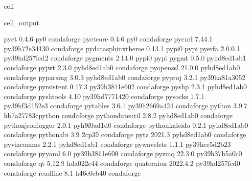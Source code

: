 \documentclass[letterpaper,table,10pt,english]{jupyterBook}
\begin{document}
\begin{sphinxuseclass}{cell}
\begin{sphinxVerbatimOutput}
\begin{sphinxuseclass}{cell_output}
\begin{sphinxVerbatim}[commandchars=\\\{\}]
pyct                      0.4.6                      py\PYGZus{}0    conda\PYGZhy{}forge
pyct\PYGZhy{}core                 0.4.6                      py\PYGZus{}0    conda\PYGZhy{}forge
pycurl                    7.44.1           py39h72e3413\PYGZus{}0    conda\PYGZhy{}forge
pydata\PYGZhy{}sphinx\PYGZhy{}theme       0.13.1                   pypi\PYGZus{}0    pypi
pyerfa                    2.0.0.1          py39hd257fcd\PYGZus{}2    conda\PYGZhy{}forge
pygments                  2.14.0                   pypi\PYGZus{}0    pypi
pygmt                     0.5.0              pyhd8ed1ab\PYGZus{}1    conda\PYGZhy{}forge
pyjwt                     2.3.0              pyhd8ed1ab\PYGZus{}0    conda\PYGZhy{}forge
pyopenssl                 21.0.0             pyhd8ed1ab\PYGZus{}0    conda\PYGZhy{}forge
pyparsing                 3.0.3              pyhd8ed1ab\PYGZus{}0    conda\PYGZhy{}forge
pyproj                    3.2.1            py39ha81a305\PYGZus{}2    conda\PYGZhy{}forge
pyrsistent                0.17.3           py39h3811e60\PYGZus{}2    conda\PYGZhy{}forge
pyshp                     2.3.1              pyhd8ed1ab\PYGZus{}0    conda\PYGZhy{}forge
pyshtools                 4.10             py39hd777142\PYGZus{}0    conda\PYGZhy{}forge
pysocks                   1.7.1            py39hf3d152e\PYGZus{}3    conda\PYGZhy{}forge
pytables                  3.6.1            py39h2669a42\PYGZus{}4    conda\PYGZhy{}forge
python                    3.9.7           hb7a2778\PYGZus{}3\PYGZus{}cpython    conda\PYGZhy{}forge
python\PYGZhy{}dateutil           2.8.2              pyhd8ed1ab\PYGZus{}0    conda\PYGZhy{}forge
python\PYGZhy{}json\PYGZhy{}logger        2.0.1              pyh9f0ad1d\PYGZus{}0    conda\PYGZhy{}forge
python\PYGZhy{}kaleido            0.2.1              pyhd8ed1ab\PYGZus{}0    conda\PYGZhy{}forge
python\PYGZus{}abi                3.9                      2\PYGZus{}cp39    conda\PYGZhy{}forge
pytz                      2021.3             pyhd8ed1ab\PYGZus{}0    conda\PYGZhy{}forge
pyviz\PYGZus{}comms               2.2.1              pyhd8ed1ab\PYGZus{}1    conda\PYGZhy{}forge
pywavelets                1.1.1            py39hce5d2b2\PYGZus{}3    conda\PYGZhy{}forge
pyyaml                    6.0              py39h3811e60\PYGZus{}0    conda\PYGZhy{}forge
pyzmq                     22.3.0           py39h37b5a0c\PYGZus{}0    conda\PYGZhy{}forge
qt                        5.12.9               hda022c4\PYGZus{}4    conda\PYGZhy{}forge
quaternion                2022.4.2         py39hd257fcd\PYGZus{}0    conda\PYGZhy{}forge
readline                  8.1                  h46c0cb4\PYGZus{}0    conda\PYGZhy{}forge

\end{sphinxVerbatim}
\end{sphinxuseclass}
\end{sphinxVerbatimOutput}
\end{sphinxuseclass}
\end{document}

